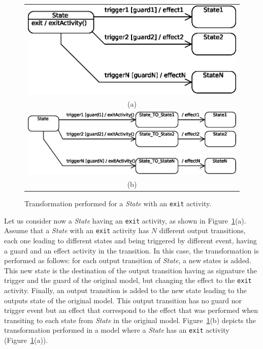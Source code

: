 \begin{figure}
\centering
  \begin{tabular}{c}
  \includegraphics[width=0.7\columnwidth]{images/exitActionsBEFORE}\\ 
(a)\\
  \includegraphics[width=0.85\columnwidth]{images/exitActionsAFTER}\\
(b)
  \end{tabular}
  \caption{Transformation performed for a {\em State} with an {\tt exit}
activity.}
  \label{fig:exitActions}
\end{figure}

Let us consider now a {\em State} having an {\tt exit} activity, as
shown in Figure~\ref{fig:exitActions}(a). Assume that a {\em State} with an
{\tt exit} activity has $N$ different output transitions, each one leading to
different states and being triggered by different event, having a guard and an
effect activity in the transition. In this case, the transformation is
performed as follows: for each output transition of {\em State}, a new states
is added. This new state is the destination of the output transition having as
signature the trigger and the guard of the original model, but changing the
effect to the {\tt exit} activity. Finally, an output transition is added to
the new state leading to the outputs state of the original model. This output
transition has no guard nor trigger event but an effect that correspond to the
effect that was performed when transiting to each state from {\em State} in the
original model. Figure~\ref{fig:exitActions}(b) depicts the transformation
performed in a  model where a {\em State} has an {\tt exit} activity
(Figure~\ref{fig:exitActions}(a)).


